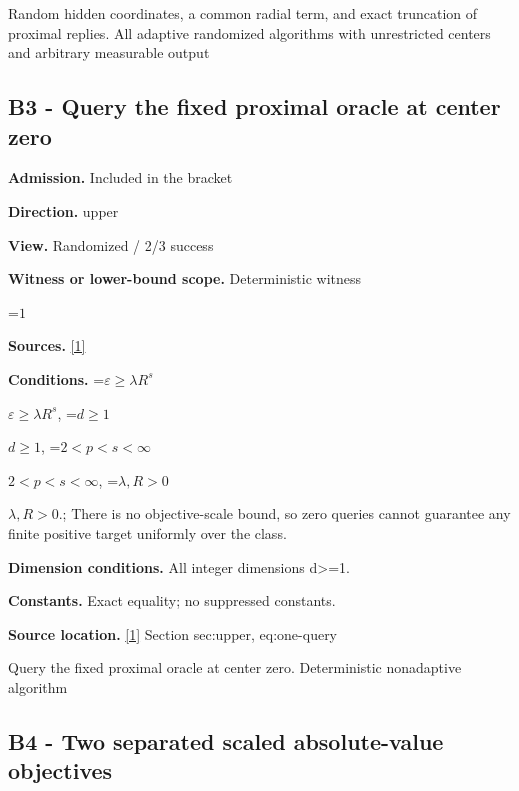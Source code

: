 \documentclass[10pt,a4paper]{article}
\newcommand{\AtlasMath}[1]{\par\begingroup\centering\setbox0=\hbox{$\displaystyle #1$}\ifdim\wd0>1.4\linewidth\typeout{ATLAS WIDE FORMULA: \the\wd0}\fi\ifdim\wd0>\linewidth\resizebox{\linewidth}{!}{\box0}\else\box0\fi\par\endgroup}
\newcommand{\AtlasInlineMath}[1]{\begingroup\setbox0=\hbox{$#1$}\ifdim\wd0>.4\linewidth\endgroup\AtlasMath{#1}\else\endgroup$#1$\fi}
\begin{document}
Random hidden coordinates, a common radial term, and exact truncation of proximal replies. All adaptive randomized algorithms with unrestricted centers and arbitrary measurable output



\subsection{B3 - Query the fixed proximal oracle at center zero}


\textbf{Admission.} Included in the bracket



\textbf{Direction.} upper



\textbf{View.} Randomized / 2/3 success



\textbf{Witness or lower-bound scope.} Deterministic witness



\AtlasMath{1}


\textbf{Sources.} \href{https://github.com/WU-Wendao/Colombo/blob/main/colombo_sensorium/Complexity_altas/data/sources/colombo/B2/manuscript.pdf}{[1]}



\textbf{Conditions.} \AtlasInlineMath{\varepsilon\ge\lambda R^s}, \AtlasInlineMath{d\ge1}, \AtlasInlineMath{2<p<s<\infty}, \AtlasInlineMath{\lambda,R>0}.; There is no objective-scale bound, so zero queries cannot guarantee any finite positive target uniformly over the class.



\textbf{Dimension conditions.} All integer dimensions d>=1.



\textbf{Constants.} Exact equality; no suppressed constants.



\textbf{Source location.} \href{https://github.com/WU-Wendao/Colombo/blob/main/colombo_sensorium/Complexity_altas/data/sources/colombo/B2/manuscript.pdf}{[1]} Section sec:upper, eq:one-query



Query the fixed proximal oracle at center zero. Deterministic nonadaptive algorithm



\subsection{B4 - Two separated scaled absolute-value objectives}
\end{document}
